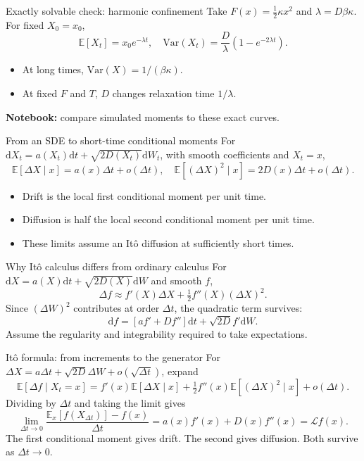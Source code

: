 \documentclass[aspectratio=169,10pt]{beamer}
\newcommand{\E}{\mathbb{E}}
\newcommand{\dd}{\mathrm{d}}
\begin{document}
\begin{frame}{Exactly solvable check: harmonic confinement}
Take $F(x)=\tfrac12\kappa x^2$ and $\lambda=D\beta\kappa$. For fixed $X_0=x_0$,
\[\E[X_t]=x_0e^{-\lambda t},\quad \mathrm{Var}(X_t)=\frac{D}{\lambda}(1-e^{-2\lambda t}).\]
\begin{itemize}\item At long times, $\mathrm{Var}(X)=1/(\beta\kappa)$.\item At fixed $F$ and $T$, $D$ changes relaxation time $1/\lambda$.\end{itemize}
\textbf{Notebook:} compare simulated moments to these exact curves.
\end{frame}

\begin{frame}{From an SDE to short-time conditional moments}
For $\dd X_t=a(X_t)\dd t+\sqrt{2D(X_t)}\dd W_t$, with smooth coefficients and $X_t=x$,
\[\E[\Delta X\mid x]=a(x)\Delta t+o(\Delta t),\quad
\E[(\Delta X)^2\mid x]=2D(x)\Delta t+o(\Delta t).\]
\begin{itemize}
\item Drift is the local first conditional moment per unit time.
\item Diffusion is half the local second conditional moment per unit time.
\item These limits assume an It\^o diffusion at sufficiently short times.
\end{itemize}
\end{frame}

\begin{frame}{Why It\^o calculus differs from ordinary calculus}
For $\dd X=a(X)\dd t+\sqrt{2D(X)}\dd W$ and smooth $f$,
\[\Delta f\approx f'(X)\Delta X+\tfrac12 f''(X)(\Delta X)^2.\]
Since $(\Delta W)^2$ contributes at order $\Delta t$, the quadratic term survives:
\[\boxed{\dd f=[af'+Df'']\dd t+\sqrt{2D}f'\dd W.}\]
Assume the regularity and integrability required to take expectations.
\end{frame}

\begin{frame}{It\^o formula: from increments to the generator}
For $\Delta X=a\Delta t+\sqrt{2D}\Delta W+o(\sqrt{\Delta t})$, expand
\[\E[\Delta f\mid X_t=x]=f'(x)\E[\Delta X\mid x]+\tfrac12 f''(x)\E[(\Delta X)^2\mid x]+o(\Delta t).\]
Dividing by $\Delta t$ and taking the limit gives
\[\lim_{\Delta t\to0}\frac{\E_x[f(X_{\Delta t})]-f(x)}{\Delta t}
=a(x)f'(x)+D(x)f''(x)=\mathcal Lf(x).\]
The first conditional moment gives drift. The second gives diffusion. Both survive as $\Delta t\to0$.
\end{frame}
\end{document}
